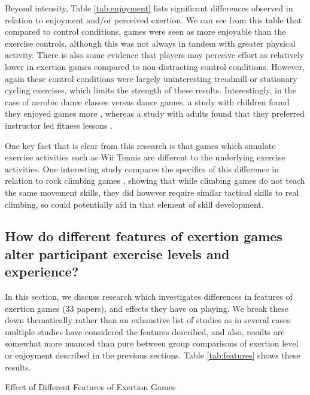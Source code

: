 Beyond intensity, Table \ref{tab:enjoyment} lists significant differences observed in relation to enjoyment and/or perceived exertion. We can see from this table that compared to control conditions, games were seen as more enjoyable than the exercise controls, although this was not always in tandem with greater physical activity. There is also some evidence \cite{Haddock_2009,Monedero2015InteractiveAdults,Devereaux2012ComparisonExercise} that players may perceive effort as relatively lower in exertion games compared to non-distracting control conditions. However, again these control conditions were largely uninteresting treadmill or stationary cycling exercises, which limits the strength of these results. Interestingly, in the case of aerobic dance classes versus dance games, a study with children found they enjoyed games more \cite{Gao2013ChildrenSDance}, whereas a study with adults found that they preferred instructor led fitness lessons \cite{eason2016comparison}. 

One key fact that is clear from this research is that games which simulate exercise activities such as Wii Tennis are different to the underlying exercise activities. One interesting study compares the specifics of this difference in relation to rock climbing games \cite{Jenny2015VirtualPerceptions}, showing that while climbing games do not teach the same movement skills, they did however require similar tactical skills to real climbing, so could potentially aid in that element of skill development.

\subsection{How do different features of exertion games alter participant exercise levels and experience?}

In this section, we discuss research which investigates differences in features of exertion games (33 papers), and effects they have on playing. We break these down thematically rather than an exhaustive list of studies as in several cases multiple studies have considered the features described, and also, results are somewhat more nuanced than pure between group comparisons of exertion level or enjoyment described in the previous sections. Table \ref{tab:features} shows these results.

\begin{table}
\caption{Effect of Different Features of Exertion Games}
\label{tab:features}
\centering

\end{table}

